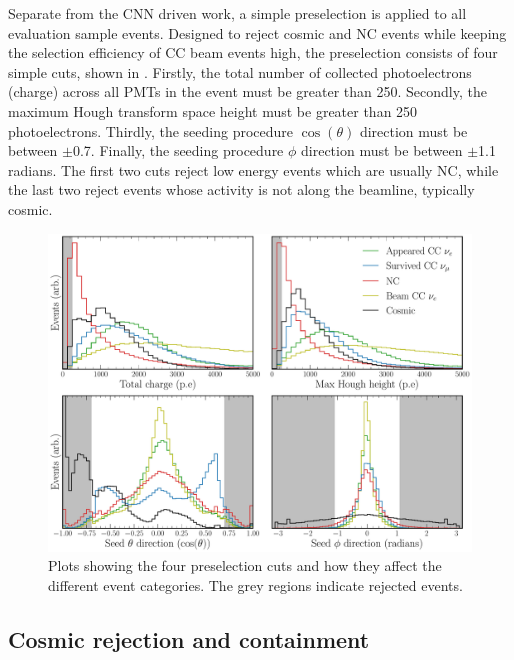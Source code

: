 Separate from the CNN driven work, a simple preselection is applied to all evaluation sample
events. Designed to reject cosmic and NC events while keeping the selection efficiency of CC beam
events high, the preselection consists of four simple cuts, shown in
. Firstly, the total number of collected photoelectrons
(charge) across all PMTs in the event must be greater than 250. Secondly, the maximum Hough
transform space height must be greater than 250 photoelectrons. Thirdly, the seeding procedure
$\cos(\theta)$ direction must be between $\pm$0.7. Finally, the seeding procedure $\phi$ direction
must be between $\pm$1.1 radians. The first two cuts reject low energy events which are usually
NC, while the last two reject events whose activity is not along the beamline, typically cosmic.

\begin{figure} %
    \includegraphics[width=\textwidth]{diagrams/7-results/explore_simple_cuts.pdf}
    \caption[Plots detailing evaluation sample preselection cuts]
    {Plots showing the four preselection cuts and how they affect the different event categories.
        The grey regions indicate rejected events.}
    \label{fig:explore_simple_cuts}
\end{figure}

\subsection{Cosmic rejection and containment} %
\label{sec:results_eval_cosmic} %

